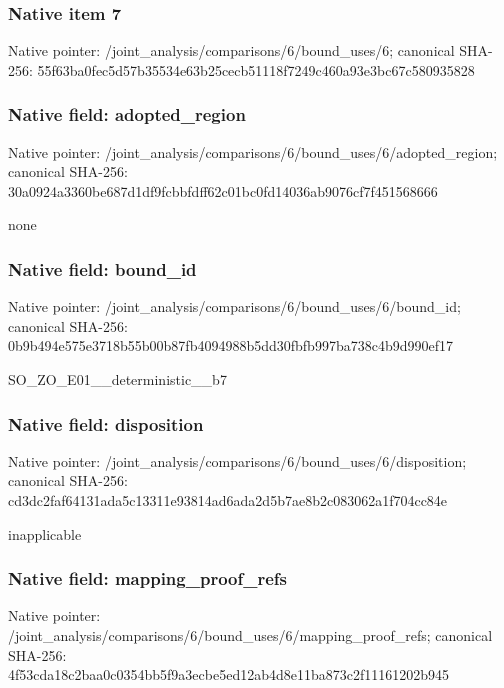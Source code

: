 \documentclass[10pt,a4paper]{article}
\begin{document}
\subsubsection{Native item 7}
Native pointer: /joint\_\allowbreak{}analysis/comparisons/6/bound\_\allowbreak{}uses/6; canonical SHA-256: 55f63ba0fec5d57b35534e63b25cecb51118f7249c460a93e3bc67c580935828

\subsubsection{Native field: adopted\_\allowbreak{}region}
Native pointer: /joint\_\allowbreak{}analysis/comparisons/6/bound\_\allowbreak{}uses/6/adopted\_\allowbreak{}region; canonical SHA-256: 30a0924a3360be687d1df9fcbbfdff62c01bc0fd14036ab9076cf7f451568666

\begingroup\raggedright\sloppy none\par\endgroup

\subsubsection{Native field: bound\_\allowbreak{}id}
Native pointer: /joint\_\allowbreak{}analysis/comparisons/6/bound\_\allowbreak{}uses/6/bound\_\allowbreak{}id; canonical SHA-256: 0b9b494e575e3718b55b00b87fb4094988b5dd30fbfb997ba738c4b9d990ef17

\begingroup\raggedright\sloppy SO\_\allowbreak{}ZO\_\allowbreak{}E01\_\allowbreak{}\_\allowbreak{}deterministic\_\allowbreak{}\_\allowbreak{}b7\par\endgroup

\subsubsection{Native field: disposition}
Native pointer: /joint\_\allowbreak{}analysis/comparisons/6/bound\_\allowbreak{}uses/6/disposition; canonical SHA-256: cd3dc2faf64131ada5c13311e93814ad6ada2d5b7ae8b2c083062a1f704cc84e

\begingroup\raggedright\sloppy inapplicable\par\endgroup

\subsubsection{Native field: mapping\_\allowbreak{}proof\_\allowbreak{}refs}
Native pointer: /joint\_\allowbreak{}analysis/comparisons/6/bound\_\allowbreak{}uses/6/mapping\_\allowbreak{}proof\_\allowbreak{}refs; canonical SHA-256: 4f53cda18c2baa0c0354bb5f9a3ecbe5ed12ab4d8e11ba873c2f11161202b945
\end{document}
